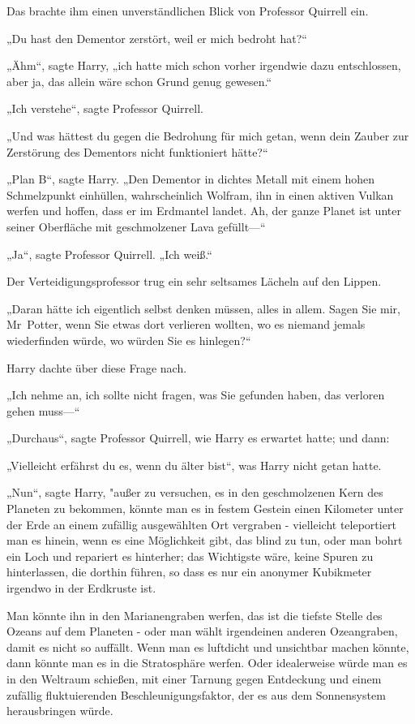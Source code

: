 {Das brachte ihm einen unverständlichen Blick von Professor Quirrell ein.

„Du hast den Dementor zerstört, weil er mich bedroht hat?“

„Ähm“, sagte Harry, „ich hatte mich schon vorher irgendwie dazu entschlossen, aber ja, das allein wäre schon Grund genug gewesen.“

„Ich verstehe“, sagte Professor Quirrell.

„Und was hättest du gegen die Bedrohung für mich getan, wenn dein Zauber zur Zerstörung des Dementors nicht funktioniert hätte?“

„Plan B“, sagte Harry. „Den Dementor in dichtes Metall mit einem hohen Schmelzpunkt einhüllen, wahrscheinlich Wolfram, ihn in einen aktiven Vulkan werfen und hoffen, dass er im Erdmantel landet. Ah, der ganze Planet ist unter seiner Oberfläche mit geschmolzener Lava gefüllt—“

„Ja“, sagte Professor Quirrell. „Ich weiß.“

Der Verteidigungsprofessor trug ein sehr seltsames Lächeln auf den Lippen.

„Daran hätte ich eigentlich selbst denken müssen, alles in allem. Sagen Sie mir, Mr~Potter, wenn Sie etwas dort verlieren wollten, wo es niemand jemals wiederfinden würde, wo würden Sie es hinlegen?“

Harry dachte über diese Frage nach.

„Ich nehme an, ich sollte nicht fragen, was Sie gefunden haben, das verloren gehen muss—“

„Durchaus“, sagte Professor Quirrell, wie Harry es erwartet hatte; und dann:

„Vielleicht erfährst du es, wenn du älter bist“, was Harry nicht getan hatte.

„Nun“, sagte Harry, "außer zu versuchen, es in den geschmolzenen Kern des Planeten zu bekommen, könnte man es in festem Gestein einen Kilometer unter der Erde an einem zufällig ausgewählten Ort vergraben - vielleicht teleportiert man es hinein, wenn es eine Möglichkeit gibt, das blind zu tun, oder man bohrt ein Loch und repariert es hinterher; das Wichtigste wäre, keine Spuren zu hinterlassen, die dorthin führen, so dass es nur ein anonymer Kubikmeter irgendwo in der Erdkruste ist.

Man könnte ihn in den Marianengraben werfen, das ist die tiefste Stelle des Ozeans auf dem Planeten - oder man wählt irgendeinen anderen Ozeangraben, damit es nicht so auffällt. Wenn man es luftdicht und unsichtbar machen könnte, dann könnte man es in die Stratosphäre werfen. Oder idealerweise würde man es in den Weltraum schießen, mit einer Tarnung gegen Entdeckung und einem zufällig fluktuierenden Beschleunigungsfaktor, der es aus dem Sonnensystem herausbringen würde.

}
